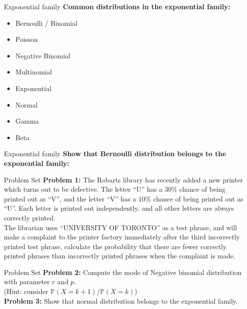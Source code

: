 \documentclass [aspectratio=169]{beamer}
\begin{document}
\begin{frame}{Exponential family}
\textbf{Common distributions in the exponential family:}\\
\begin{itemize}
    \item Bernoulli / Binomial 
    \item Poisson
    \item Negative Binomial
    \item Multinomial
    \item Exponential
    \item Normal
    \item Gamma
    \item Beta
\end{itemize}
\vspace{0.1in}
\end{frame}


\begin{frame}{Exponential family}
\textbf{Show that Bernoulli distribution belongs to the exponential family:}\\

\vspace{2in}
\end{frame}


\begin{frame}{Problem Set}
    \textbf{Problem 1:}  The Robarts library has recently added a new printer which turns out to be defective. The letter “U” has a $30\%$ chance of being printed out as “V”, and the letter “V” has a $10\%$ chance of being printed out as “U”. Each letter is printed out independently, and all other letters are always correctly printed.\\
    The librarian uses “UNIVERSITY OF TORONTO” as a test phrase, and will make a complaint to the printer factory immediately after the third incorrectly printed test phrase, calculate the probability that there are fewer correctly printed phrases than incorrectly printed phrases when the complaint is made.
\\
    \vspace{0.1in}
\end{frame}


\begin{frame}{Problem Set}
    \textbf{Problem 2:} Compute the mode of Negative binomial distribution with parameter $r$ and $p$. \\
    (Hint: consider ${\mathbb{P}(X = k+1)}/{\mathbb{P}(X = k)}$)\\
    \vspace{0.1in}
   \textbf{Problem 3:} Show that normal distribution belongs to the exponential family.

\end{frame}
\end{document}
